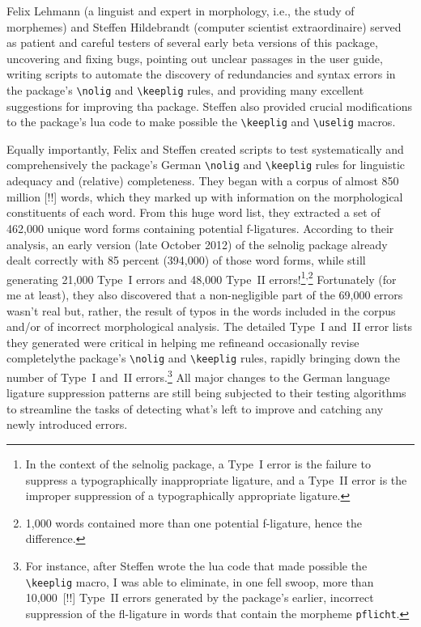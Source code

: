 \documentclass[11pt]{article}
\newcommand{\pkg}[1]{\textsf{#1}}
\newcommand{\opt}[1]{\texttt{#1}}
\newcommand{\cmmd}[1]{\texttt{\textbackslash #1}}
\begin{document}
Felix Lehmann (a linguist and expert in morphology, i.e., the study of morphemes) and Steffen Hildebrandt (computer scientist extraordinaire) served as patient and careful testers of several early beta versions of this package, uncovering and fixing bugs, pointing out unclear passages in the user guide, writing scripts to automate the discovery of redundancies and syntax errors in the package's \cmmd{nolig} and \cmmd{keeplig} rules, and providing many excellent suggestions for improving tha package. Steffen also provided crucial modifications to the package's lua code to make possible the \cmmd{keeplig} and \cmmd{uselig} macros.

\enlargethispage{0.5\baselineskip}

Equally importantly, Felix and Steffen created scripts to test systematically and comprehensively the package's German \cmmd{nolig} and \cmmd{keeplig} rules for linguistic adequacy and (relative) completeness.
They began with a corpus of almost 850 million [!!] words, which they marked up with information on the morphological constituents of each word. From this huge word list, they extracted a set of 462,000 unique word forms containing potential f-ligatures.
According to their analysis, an early version (late October 2012) of the \pkg{selnolig} package already dealt correctly with 85 percent (394,000) of those word forms, while still generating 21,000 Type~I errors and 48,000 Type~II errors!\footnote{In the context of the \pkg{selnolig} package, a Type~I error is the failure to suppress a typographically inappropriate ligature, and a Type~II error is the improper suppression of a typographically appropriate ligature.}\textsuperscript{,}\footnote{1,000 words contained more than one potential f-ligature, hence the difference.} 
Fortunately (for me at least), they also discovered that a non-negligible part of the 69,000 errors wasn't real but, rather, the result of typos in the words included in the corpus and/or of incorrect morphological analysis. The detailed Type~I and~II error lists they generated were critical in helping me refine\textemdash and occasionally revise completely\textemdash the package's \cmmd{nolig} and \cmmd{keeplig} rules, rapidly bringing down the number of Type~I and~II errors.\footnote{For instance, after Steffen wrote the lua code that made possible the \cmmd{keeplig} macro, I was able to eliminate, in one fell swoop, more than 10,000~[!!] Type~II errors generated by the package's earlier, incorrect suppression of the fl-ligature in words that contain the morpheme \opt{pflicht}. } All major changes to the German language ligature suppression patterns are still being subjected to their testing algorithms to streamline the tasks of detecting what's left to improve and catching any newly introduced errors.
\end{document}
